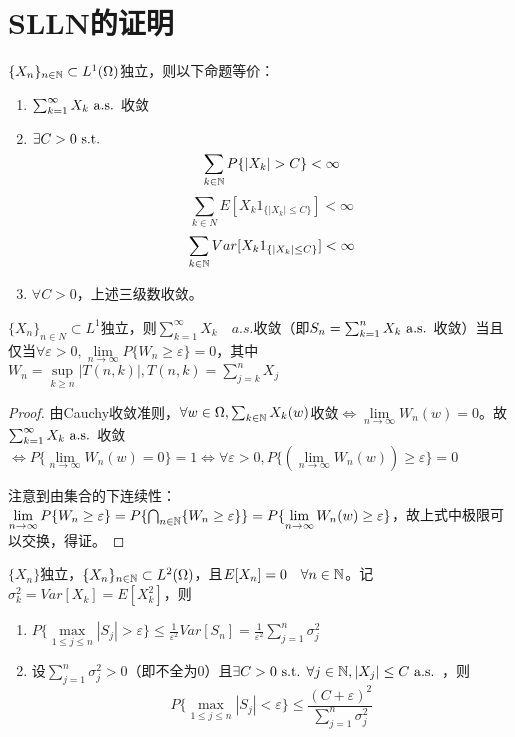 \documentclass{ctexbook}
\begin{document}
\section{SLLN的证明}
\begin{Thm}
  $\{X_{n}\}_{n\in\mathbb{N}}\subset L^{1}(\Omega)$独立，则以下命题等价：
  \begin{enumerate}
  \item $\sum_{k=1}^{\infty}X_{k}\text{ a.s. }$收敛
  \item $\exists C>0\text{ s.t. }$
    \[\sum_{k\in\N}P\{|X_{k}|>C\}<\infty\]
    \[\sum_{k\in N}E[X_{k}1_{\{|X_{k}|\leq C\}}]<\infty\]
    \[\sum_{k\in\mathbb{N}}Var[X_{k}1_{\{|X_{k}|\leq C\}}]<\infty\]
  \item $\forall C>0$，上述三级数收敛。
  \end{enumerate}
\end{Thm}

\begin{Lemma}\label{Lem-1}
  $\{X_{n}\}_{n\in N}\subset L^{1}$独立，则$\sum_{k=1}^{\infty}X_{k}\quad a.s.$收敛（即$S_{n}=\sum_{k=1}^{n}X_{k}\text{ a.s. }$收敛）当且仅当$\forall\varepsilon>0,\lim\limits_{n\to\infty}P\{W_{n}\geq \varepsilon\}=0$，其中$W_{n}=\sup\limits_{k\geq n}|T(n,k)|, T(n,k)=\sum_{j=k}^{n}X_{j}$
\end{Lemma}  

\begin{proof}
  由Cauchy收敛准则，$\forall w\in \Omega, \sum_{k\in\mathbb{N}}X_{k}(w)$收敛$\Leftrightarrow \lim\limits_{n\to\infty}W_{n}(w)=0$。故$\sum_{k=1}^{\infty}X_{k}\text{ a.s. }$收敛$\Leftrightarrow P\{\lim\limits_{n\to\infty}W_{n}(w)=0\}=1\Leftrightarrow \forall\varepsilon>0, P\{(\lim\limits_{n\to\infty} W_{n}(w))\geq\varepsilon\}=0$

  注意到由集合的下连续性：$\lim\limits_{n\to\infty}P\{W_{n}\geq\varepsilon\}=P\{\bigcap_{n\in\mathbb{N}}\{W_{n}\geq\varepsilon\}\}=P\{\lim\limits_{n\to\infty} W_{n}(w)\geq\varepsilon\}$，故上式中极限可以交换，得证。
\end{proof}

\begin{Lemma}\label{Lem-2}
  $\{X_{n}\}$独立，$\{X_{n}\}_{n\in\mathbb{N}}\subset L^{2}(\Omega)$，且$E[X_{n}]=0\quad\forall n\in\mathbb{N}$。记$\sigma^{2}_{k}=Var[X_{k}]=E[X_{k}^{2}]$，则
  \begin{enumerate}
  \item $P\{\max\limits_{1\leq j\leq n}|S_{j}|>\varepsilon\}\leq \frac{1}{\varepsilon^{2}}Var[S_{n}]=\frac{1}{\varepsilon^{2}}\sum_{j=1}^{n}\sigma_{j}^{2}$
  \item 设$\sum_{j=1}^{n}\sigma_{j}^{2}>0$（即不全为0）且$\exists C>0\text{ s.t. } \forall j\in\mathbb{N}, |X_{j}|\leq C\text{ a.s. }$，则
    \[P\{\max\limits_{1\leq j\leq n}|S_{j}|<\varepsilon\}\leq \frac{(C+\varepsilon)^{2}}{\sum_{j=1}^{n}\sigma_{j}^{2}}\]
  \end{enumerate}
\end{Lemma}
\end{document}
